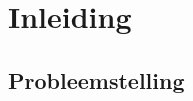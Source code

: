 
\chapter{Inleiding}
\label{ch:inleiding}



\section{Probleemstelling}
\label{sec:probleemstelling}


